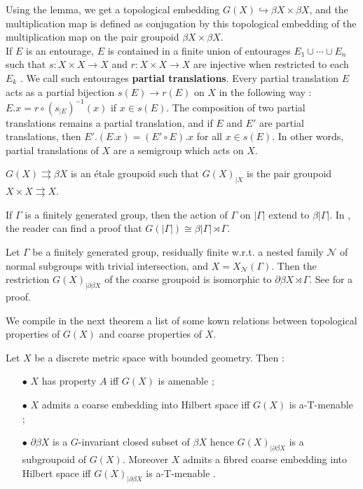 Using the lemma, we get a topological embedding $G(X)\hookrightarrow \beta X\times \beta X$, and the multiplication map is defined as conjugation by this topological embedding of the multiplication map on the pair groupoid $\beta X\times \beta X$.\\

If $E$ is an entourage, $E$ is contained in a finite union of entourages $E_1\cup \cdots \cup E_n$ such that $s: X\times X \rightarrow X$ and $r: X\times X \rightarrow X$ are injective when restricted to each $E_k$ \cite{RoeCoarse}. We call such entourages \textbf{partial translations}. Every partial translation $E$ acts as a partial bijection $s(E)\rightarrow r(E)$ on $X$ in the following way : $E.x = r\circ (s_{|E})^{-1}(x)$ if $x\in s(E)$. The composition of two partial translations remains a partial translation, and if $E$ and $E'$ are partial translations, then $E'.(E.x) = (E'\circ E).x$ for all $x\in s(E)$. In other words, partial translations of $X$ are a semigroup which acts on $X$.

\begin{prop}\cite{SkTuYu} $G(X)\rightrightarrows \beta X$ is an étale groupoid such that $G(X)_{|X}$ is the pair groupoid $X\times X\rightrightarrows X$.  
\end{prop}

\begin{Expl} If $\Gamma$ is a finitely generated group, then the action of $\Gamma$ on $|\Gamma|$ extend to $\beta | \Gamma |$. In \cite{SkTuYu}, the reader can find a proof that $G( | \Gamma | )\cong \beta | \Gamma | \rtimes \Gamma $.
\end{Expl}

\begin{Expl} Let $\Gamma$ be a finitely generated group, residually finite w.r.t. a nested family $\mathcal N$ of normal subgroups with trivial intersection, and $X=X_{\mathcal N}(\Gamma)$. Then the restriction $G(X)_{|\partial \beta X}$ of the coarse groupoid is isomorphic to $\partial \beta X\rtimes \Gamma$. See \cite{FinnCoarse} for a proof.
\end{Expl}

We compile in the next theorem a list of some kown relations between topological properties of $G(X)$ and coarse properties of $X$.

\begin{thm}\label{propertiesXG}
Let $X$ be a discrete metric space with bounded geometry. Then :
\begin{itemize}
\item[$\bullet$] $X$ has property $A$ iff $G(X)$ is amenable \cite{SkTuYu};
\item[$\bullet$] $X$ admits a coarse embedding into Hilbert space iff $G(X)$ is a-T-menable \cite{SkTuYu};
\item[$\bullet$] $\partial \beta X$ is a $G$-invariant closed subset of $\beta X$ hence $G(X)_{|\partial\beta X}$ is a subgroupoid of $G(X)$. Moreover $X$ admits a fibred coarse embedding into Hilbert space iff $G(X)_{|\partial\beta X}$ is a-T-menable \cite{FinnSellFibred}.
\end{itemize}
\end{thm}

